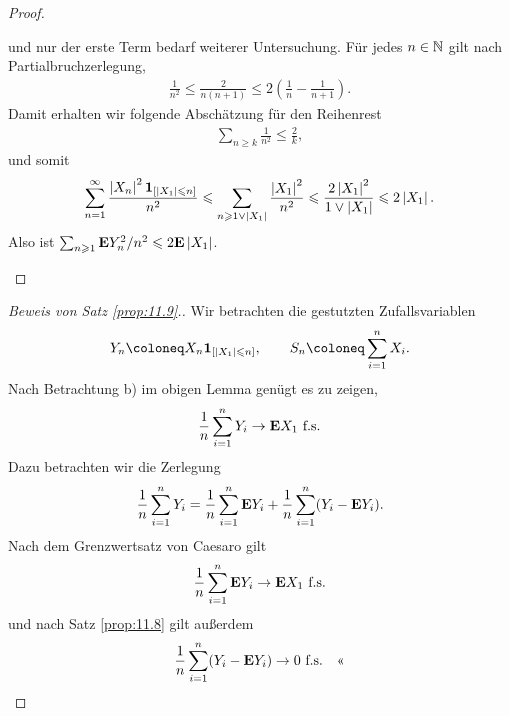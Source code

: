 \begin{proof}
\begin{proofenum}
und nur der erste Term bedarf weiterer Untersuchung.
Für jedes $n\in\mathbb{N}$ gilt nach Partialbruchzerlegung,
\begin{align*}
\frac{1}{n^2} \le \frac{2}{n(n+1)}
\le
2\left(\frac{1}{n} - \frac{1}{n+1}\right).
\end{align*}
Damit erhalten wir folgende Abschätzung für den Reihenrest
\begin{align*}
\sum_{n\ge k}\frac{1}{n^2} \le \frac{2}{k},\tag{*}
\end{align*}
und somit
\begin{align*}
\sum_{n=1}^\infty \frac{\left|X_n\right|^2\mathbf{1}_{[\left|X_1\right|\leqslant n]}}{n^2}
\leqslant
\sum_{n\geqslant 1\lor\left|X_1\right|} \frac{\left|X_1\right|^2}{n^2}
\leqslant
\frac{2\left|X_1\right|^2}{1\lor\left|X_1\right|}
\leqslant 2 \left|X_1\right|.
\end{align*}
Also ist $\sum_{n\geqslant 1} \textbf{E} Y_n^2/n^2 \leqslant 2 \textbf{E} \left|X_1\right|$.\qedhere
\end{proofenum}
\end{proof}

\begin{proof}[Beweis von Satz \ref{prop:11.9}.]
Wir betrachten die gestutzten Zufallsvariablen
\begin{align*}
Y_n \defl X_n \Id_{[\abs{X_1}\le n]},\qquad S_n \defl \sum_{i=1}^n X_i.
\end{align*}
Nach Betrachtung b) im obigen Lemma genügt es zu zeigen,
\begin{align*}
\frac{1}{n}\sum_{i=1}^n Y_i \to \textbf{E} X_1\ \text{f.s.}
\end{align*}
Dazu betrachten wir die Zerlegung 
\begin{align*}
\frac{1}{n}\sum_{i=1}^n Y_i = 
\frac{1}{n}\sum_{i=1}^n \textbf{E} Y_i
+ \frac{1}{n}\sum_{i=1}^n (Y_i-\textbf{E} Y_i).
\end{align*}
Nach dem Grenzwertsatz von Caesaro gilt
\begin{align*}
\frac{1}{n}\sum_{i=1}^n \textbf{E} Y_i \to \textbf{E} X_1\ \text{f.s.}
\end{align*}
und nach Satz \ref{prop:11.8} gilt außerdem
\begin{align*}
\frac{1}{n}\sum_{i=1}^n (Y_i-\textbf{E} Y_i) \to 0\ \text{f.s.}\quad\text{<<}
\end{align*}
\end{proof}

